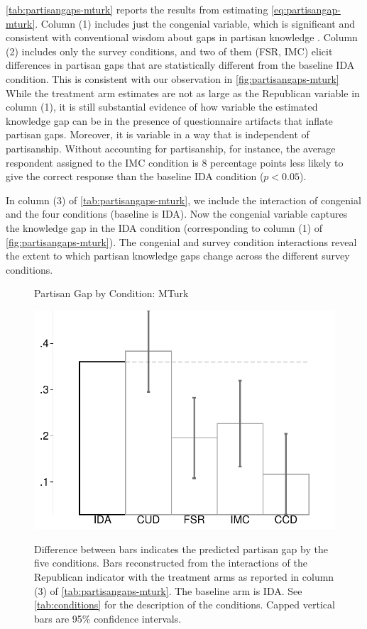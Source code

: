 \documentclass[12pt, letterpaper]{article}
\begin{document}
\cref{tab:partisangaps-mturk} reports the results from estimating \cref{eq:partisangap-mturk}. Column (1) includes just the congenial variable, which is significant and consistent with conventional wisdom about gaps in partisan knowledge \citep[e.g.][]{bullocketal_2015, pew2018disagree}.
Column (2) includes only the survey conditions, and two of them (FSR, IMC) elicit differences in partisan gaps that are statistically different from the baseline IDA condition. This is consistent with our observation in \cref{fig:partisangaps-mturk} While the treatment arm estimates are not as large as the Republican variable in column (1), it is still substantial evidence of how variable the estimated knowledge gap can be in the presence of questionnaire artifacts that inflate partisan gaps.
Moreover, it is variable in a way that is independent of partisanship. Without accounting for partisanship, for instance, the average respondent assigned to the IMC condition is 8 percentage points less likely to give the correct response than the baseline IDA condition ($p<0.05$).

In column (3) of \cref{tab:partisangaps-mturk}, we include the interaction of congenial and the four conditions (baseline is IDA). Now the congenial variable captures the knowledge gap in the IDA condition (corresponding to column (1) of \cref{fig:partisangaps-mturk}). The congenial and survey condition interactions reveal the extent to which partisan knowledge gaps change across the different survey conditions. 

\begin{figure}[t]
	\centering
	\caption{Partisan Gap by Condition: MTurk}
	\includegraphics[width=.55\textwidth]{../figs/mturk-pgag-surveyarms.pdf}
	\label{fig:partisangaps-mturk-reg}
	\caption*{\footnotesize
		Difference between bars indicates the predicted partisan gap by the five conditions.
		Bars reconstructed from the interactions of the Republican indicator with the treatment arms as reported in column (3) of \cref{tab:partisangaps-mturk}.
		The baseline arm is IDA.
		See \cref{tab:conditions} for the description of the conditions.
		Capped vertical bars are 95\% confidence intervals.
	}
\end{figure}
\end{document}
